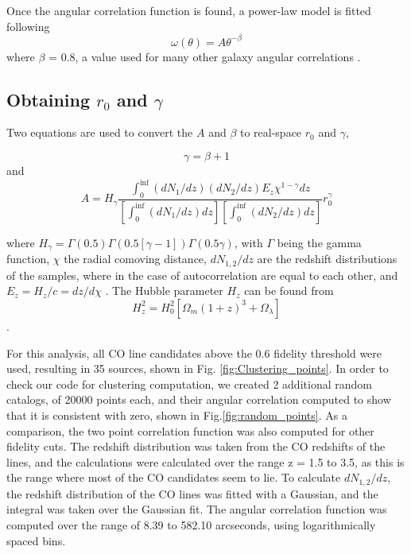 




Once the angular correlation function is found, a power-law model is fitted following $$\omega(\theta) = A\theta^{-\beta} $$ where $\beta$ = 0.8, a value used for many other galaxy angular correlations \cite{hickox2011clustering}.

\subsection{Obtaining $r_0$ and $\gamma$}

Two equations are used to convert the $A$ and $\beta$ to real-space $r_0$ and $\gamma$, 

$$ \gamma = \beta + 1 $$ and $$ A = H_{\gamma}\frac{\int_{0}^{\inf} (dN_1/dz)(dN_2/dz)E_z\chi^{1 - \gamma} dz}{[\int_{0}^{\inf} (dN_1/dz)dz][\int_{0}^{\inf} (dN_2/dz)dz]}r_0^{\gamma}$$

where $H_{\gamma} = \Gamma(0.5)\Gamma(0.5[\gamma -1])\Gamma(0.5\gamma)$, with $\Gamma$ being the gamma function, $\chi$ the radial comoving distance, $dN_{1,2}/dz$ are the redshift distributions of the samples, where in the case of autocorrelation are equal to each other, and $E_z = H_z/c = dz/d\chi$ \cite{hickox2011clustering}. The Hubble parameter $H_z$ can be found from
$$H_z^2 = H_0^2[\Omega_m(1+z)^3 + \Omega_{\lambda}]$$ \cite{hickox2011clustering}.

For this analysis, all CO line candidates above the 0.6 fidelity threshold were used, resulting in 35 sources, shown in Fig. \ref{fig:Clustering_points}. In order to check our code for clustering computation, we created 2 additional random catalogs, of 20000 points each, and their angular correlation computed to show that it is consistent with zero, shown in Fig.\ref{fig:random_points}. As a comparison, the two point correlation function was also computed for other fidelity cuts. The redshift distribution was taken from the CO redshifts of the lines, and the calculations were calculated over the range z = 1.5 to 3.5, as this is the range where most of the CO candidates seem to lie. To calculate $dN_{1,2}/dz$, the redshift distribution of the CO lines was fitted with a Gaussian, and the integral was taken over the Gaussian fit. The angular correlation function was computed over the range of 8.39 to 582.10 arcseconds, using logarithmically spaced bins. 

